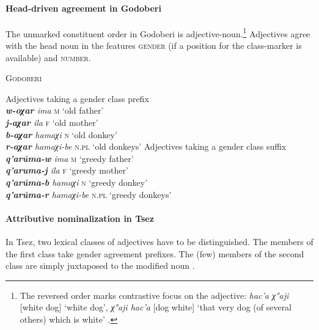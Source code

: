 \paragraph{Head-driven agreement in Godoberi}
The unmarked constituent order in Godoberi is adjective-noun.\footnote{The reversed order marks contrastive focus on the adjective: \textit{hac'a χ°aji} [white dog] ‘white dog’, \textit{χ°aji hac'a} [dog white] ‘that very dog (of several others) which is white’ \citep[149]{kazenin1996a}.} Adjectives agree with the head noun in the features \textsc{gender} (if a position for the class-marker is available) and \textsc{number}.
\begin{exe}
\ex \textsc{Godoberi} \cite[25]{tatevosov1996a}
\begin{xlist}
\ex Adjectives taking a gender class prefix\\
\textit{\textbf{w-oχar} ima} \textsc{m} ‘old father’\\
\textit{\textbf{j-aχar} ila} \textsc{f} ‘old mother’\\
\textit{\textbf{b-aχar} hamaχi} \textsc{n} ‘old donkey’\\
\textit{\textbf{r-aχar} hamaχi-be} \textsc{n.pl} ‘old donkeys’
\ex Adjectives taking a gender class suffix\\
\textit{\textbf{q'arúma-w} ima} \textsc{m} ‘greedy father’\\
\textit{\textbf{q'aruma-j} ila} \textsc{f} ‘greedy mother’\\
\textit{\textbf{q'arúma-b} hamaχi} \textsc{n} ‘greedy donkey’\\
\textit{\textbf{q'arúma-r} hamaχi-be} \textsc{n.pl} ‘greedy donkeys’
\end{xlist}
\end{exe}

\paragraph{Attributive nominalization in Tsez}
In Tsez, two lexical classes of adjectives have to be distinguished. The members of the first class take gender agreement prefixes. The (few) members of the second class are simply juxtaposed to the modified noun \cite[126]{alekseev-etal2004}.

